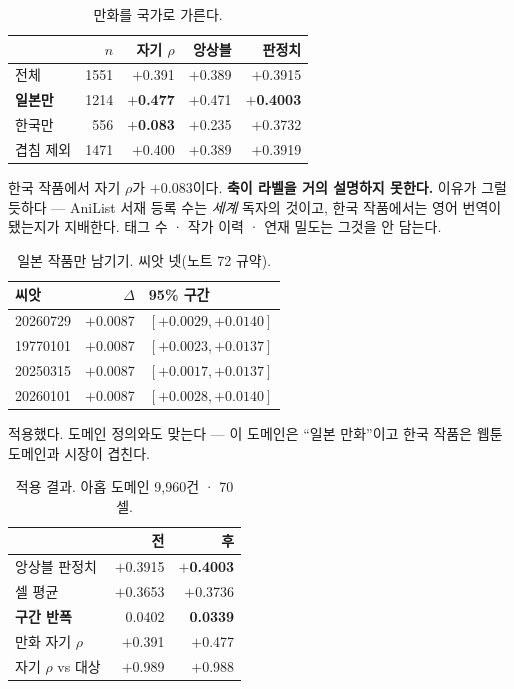 \documentclass[10pt]{article}
\begin{document}
\begin{table}[t]
\centering\tsize
\caption{만화를 국가로 가른다.}
\begin{tabular}{lrrrr}
\toprule
& $n$ & 자기 $\rho$ & 앙상블 & 판정치 \\
\midrule
전체 & 1551 & $+$0.391 & $+$0.389 & $+$0.3915 \\
\textbf{일본만} & 1214 & \textbf{$+$0.477} & $+$0.471 & \textbf{$+$0.4003} \\
한국만 & 556 & \textbf{$+$0.083} & $+$0.235 & $+$0.3732 \\
겹침 제외 & 1471 & $+$0.400 & $+$0.389 & $+$0.3919 \\
\bottomrule
\end{tabular}
\end{table}

한국 작품에서 자기 $\rho$가 $+$0.083이다. \textbf{축이 라벨을 거의 설명하지
못한다.} 이유가 그럴듯하다 --- AniList 서재 등록 수는 \emph{세계} 독자의 것이고,
한국 작품에서는 영어 번역이 됐는지가 지배한다. 태그 수 · 작가 이력 · 연재
밀도는 그것을 안 담는다.

\begin{table}[t]
\centering\tsize
\caption{일본 작품만 남기기. 씨앗 넷(노트 72 규약).}
\begin{tabular}{lrl}
\toprule
씨앗 & $\Delta$ & 95\% 구간 \\
\midrule
20260729 & $+$0.0087 & $[+0.0029, +0.0140]$ \\
19770101 & $+$0.0087 & $[+0.0023, +0.0137]$ \\
20250315 & $+$0.0087 & $[+0.0017, +0.0137]$ \\
20260101 & $+$0.0087 & $[+0.0028, +0.0140]$ \\
\bottomrule
\end{tabular}
\end{table}

적용했다. 도메인 정의와도 맞는다 --- 이 도메인은 ``일본 만화''이고 한국 작품은
웹툰 도메인과 시장이 겹친다.

\begin{table}[t]
\centering\tsize
\caption{적용 결과. 아홉 도메인 9,960건 · 70셀.}
\begin{tabular}{lrr}
\toprule
& 전 & 후 \\
\midrule
앙상블 판정치 & $+$0.3915 & \textbf{$+$0.4003} \\
셀 평균 & $+$0.3653 & $+$0.3736 \\
\textbf{구간 반폭} & 0.0402 & \textbf{0.0339} \\
만화 자기 $\rho$ & $+$0.391 & $+$0.477 \\
자기 $\rho$ vs 대상 & $+$0.989 & $+$0.988 \\
\bottomrule
\end{tabular}
\end{table}
\end{document}
